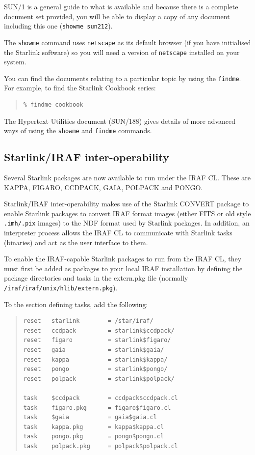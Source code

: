 \documentclass[twoside,11pt]{article}
\newcommand{\xref}[3]{#1}
\newcommand{\xlabel}[1]{}
\renewcommand{\_}{\texttt{\symbol{95}}}
\begin{document}
SUN/1 is a general guide to what is available and because there is a
complete document set provided, you will be able to display a copy of any
document including this one (\texttt{showme sun212}).

The \texttt{showme} command uses \texttt{netscape} as its default browser
(if you have initialised the Starlink software) so you will need a version
of \texttt{netscape} installed on your system.

You can find the documents relating to a particular topic by using the
\texttt{findme}. For example, to find the Starlink Cookbook series: 

\begin{quote}
\begin{verbatim}
% findme cookbook
\end{verbatim}
\end{quote}

The \xref{Hypertext Utilities}{sun188}{} document (SUN/188) gives details
of more advanced ways of using the \texttt{showme} and \texttt{findme}
commands.

\subsection{\xlabel{starlink_iraf_inter-operability}Starlink/IRAF inter-operability}
\label{starlink_iraf_inter-operability}

Several Starlink packages are now available to run under the IRAF CL\@.  These
are  KAPPA, FIGARO, CCDPACK, GAIA, POLPACK and PONGO.

Starlink/IRAF inter-operability makes use of the Starlink CONVERT
package to enable Starlink packages to convert IRAF format images
(either FITS or old style \texttt{.imh/.pix} images) to the NDF format
used by Starlink packages.  In addition, an interpreter process allows
the IRAF CL to communicate with Starlink tasks (binaries) and act as
the user interface to them.

To enable the IRAF-capable Starlink packages to run from the IRAF CL,
they must first be added as packages to your local IRAF installation by
defining the package directories and tasks in the extern.pkg file
(normally \texttt{/iraf/iraf/unix/hlib/extern.pkg}).

To the section defining tasks, add the following:

\begin{quote}
\begin{verbatim}
reset   starlink        = /star/iraf/
reset   ccdpack         = starlink$ccdpack/
reset   figaro          = starlink$figaro/
reset   gaia            = starlink$gaia/
reset   kappa           = starlink$kappa/
reset   pongo           = starlink$pongo/
reset   polpack         = starlink$polpack/
 
task    $ccdpack        = ccdpack$ccdpack.cl
task    figaro.pkg      = figaro$figaro.cl
task    $gaia           = gaia$gaia.cl
task    kappa.pkg       = kappa$kappa.cl
task    pongo.pkg       = pongo$pongo.cl
task    polpack.pkg     = polpack$polpack.cl
\end{verbatim}
\end{quote}
\end{document}
